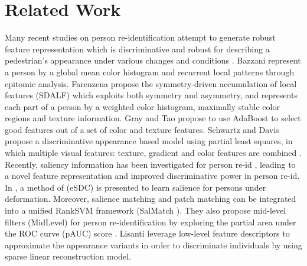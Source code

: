 \documentclass[10pt,journal,twocolumn]{IEEEtran}
\begin{document}
\section{Related Work}\label{sec:related}

Many recent studies on person re-identification attempt to generate robust feature representation which is discriminative and robust for describing a pedestrian's appearance under various changes and conditions
 \cite{Bazzani2012Multiple,Farenzena2010Person,Gheissari2006Person,Gray2008Viewpoint,Wang2007Shape,Zhao2013Unsupervised,MidLevelFilter}.
Bazzani \etal\cite{Bazzani2012Multiple} represent a person by a global mean color histogram and recurrent local patterns through epitomic analysis.
Farenzena \etal\cite{Farenzena2010Person} propose the symmetry-driven accumulation of local features (SDALF) which exploits both symmetry and asymmetry, and represents each part of a person by a weighted color histogram, maximally stable color regions and texture information. Gray and Tao \cite{Gray2008Viewpoint} propose to use AdaBoost to select good features out of a set of color and texture features. Schwartz and Davis propose a discriminative appearance based model using partial least squares, in which multiple visual features: texture, gradient and color features are combined \cite{Schwartz2009Learning}. 
Recently, saliency information has been investigated for person re-id \cite{Zhao2013Unsupervised,Zhao2013SalMatch}, leading to a novel feature representation and improved discriminative power in person re-id.
In \cite{Zhao2013Unsupervised}, a method of (eSDC) is presented to learn salience for persons under deformation.
Moreover, salience matching and patch matching can be integrated into a unified RankSVM framework (SalMatch \cite{Zhao2013SalMatch}).
They also propose mid-level filters (MidLevel) for person re-identification
by exploring the partial area under the ROC curve (pAUC) score \cite{MidLevelFilter}. Lisanti \etal\cite{Giuseppe2015PAMI} leverage  low-level feature descriptors to approximate the appearance variants in order to discriminate individuals by using sparse linear reconstruction model.
\end{document}
